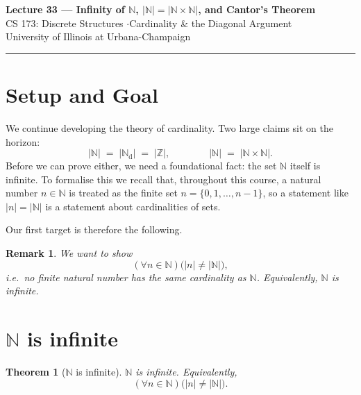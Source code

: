\documentclass[11pt]{article}
\theoremstyle{defstyle}
\theoremstyle{thmstyle}
\newtheorem{theorem}{Theorem}[section]
\theoremstyle{notstyle}
\newtheorem*{remark}{Remark}
\theoremstyle{cautionstyle}
\newcommand{\Z}{\mathbb{Z}}
\newcommand{\N}{\mathbb{N}}
\newcommand{\Nd}{\mathbb{N}_{\text{d}}}
\begin{document}
\begin{center}
  {\Large\bfseries Lecture 33 --- Infinity of $\N$, $|\N| = |\N \times \N|$, and Cantor's Theorem}\\[4pt]
  {\normalsize CS 173: Discrete Structures \quad$\cdot$\quad Cardinality \& the Diagonal Argument}\\[2pt]
  {\small\color{gray} University of Illinois at Urbana-Champaign}
\end{center}
\vspace{1em}\hrule\vspace{1.5em}

\section{Setup and Goal}

We continue developing the theory of cardinality. Two large claims sit on the
horizon:
\[
  |\N| \;=\; |\Nd| \;=\; |\Z|, \qquad\qquad |\N| \;=\; |\N \times \N|.
\]
Before we can prove either, we need a foundational fact: the set $\N$ itself is
infinite. To formalise this we recall that, throughout this course, a natural
number $n \in \N$ is treated as the finite set $n = \{0, 1, \dots, n-1\}$, so a
statement like $|n| = |\N|$ is a statement about cardinalities of sets.

Our first target is therefore the following.

\begin{notebox}
\begin{remark}
We want to show
\[
  (\forall n \in \N)\bigl(|n| \neq |\N|\bigr),
\]
i.e.\ no finite natural number has the same cardinality as $\N$. Equivalently,
$\N$ is infinite.
\end{remark}
\end{notebox}

\section{$\N$ is infinite}

\begin{thmbox}
\begin{theorem}[$\N$ is infinite]
$\N$ is infinite. Equivalently,
\[
  (\forall n \in \N)\bigl(|n| \neq |\N|\bigr).
\]
\end{theorem}
\end{thmbox}
\end{document}
